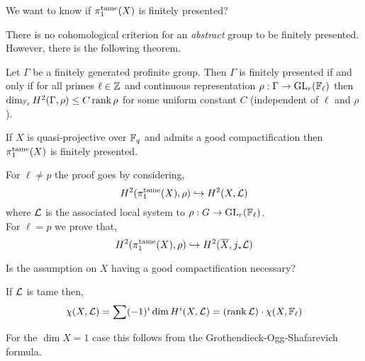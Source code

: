 \documentclass[12pt]{article}
\begin{document}
\begin{rmk}
We want to know if $\pi_1^{\mathrm{tame}}(X)$ is finitely presented? 
\end{rmk}

\begin{rmk}
There is no cohomological criterion for an \textit{abstract} group to be finitely presented. However, there is the following theorem.
\end{rmk}

\begin{theorem}[Lubotzky]
Let $\Gamma$ be a finitely generated profinite group. Then $\Gamma$ is finitely presented if and only if for all primes $\ell \in \mathbb{Z}$ and continuous representation $\rho : \Gamma \to \mathrm{GL}_r(\mathbb{F}_\ell)$ then $\dim_{\mathbb{F}_\ell} H^2(\Gamma, \rho) \le C \operatorname{\mathrm{rank}}{\rho}$ for some uniform constant $C$ (independent of $\ell$ and $\rho$). 
\end{theorem}

\begin{theorem}
If $X$ is quasi-projective over $\mathbb{F}_q$ and admits a good compactification then $\pi_1^{\mathrm{tame}}(X)$ is finitely presented. 
\end{theorem}

\begin{rmk}
For $\ell \neq p$ the proof goes by considering,
\[ H^2(\pi_1^{\mathrm{tame}}(X), \rho) \hookrightarrow H^2(X, \mathcal{L}) \]
where $\mathcal{L}$ is the associated local system to $\rho : G \to \mathrm{GL}_r(\mathbb{F}_{\ell})$. 
\bigskip\\
For $\ell = p$ we prove that,
\[ H^2(\pi_1^{\mathrm{tame}}(X), \rho) \hookrightarrow H^2(\overline{X}, j_* \mathcal{L}) \]
\end{rmk}

\begin{rmk}
Is the assumption on $X$ having a good compactification necessary? 
\end{rmk}

\begin{lemma}[Delgine]
If $\mathcal{L}$ is tame then,
\[ \chi(X, \mathcal{L}) = \sum (-1)^i \dim H^i(X, \mathcal{L}) = (\operatorname{\mathrm{rank}}{\mathcal{L}}) \cdot \chi(X, \mathbb{F}_\ell) \]
\end{lemma}

\begin{rmk}
For the $\dim{X} = 1$ case this follows from the Grothendieck-Ogg-Shafarevich formula.
\end{rmk}
\end{document}

